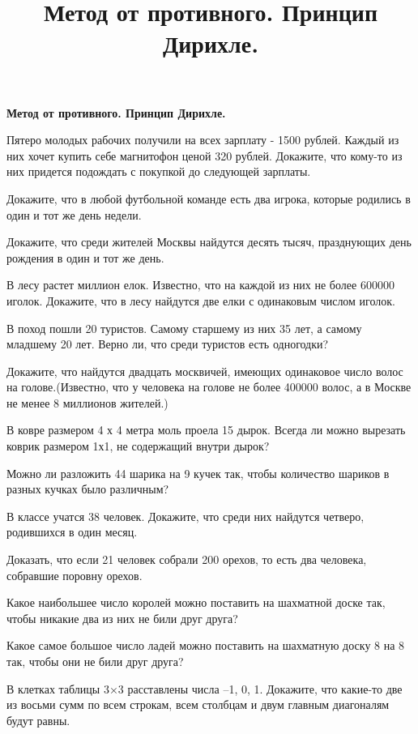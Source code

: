 \centerline{\bf \Huge Метод от противного. Принцип Дирихле.}
\title{Метод от противного. Принцип Дирихле.}

Пятеро молодых рабочих получили на всех зарплату - 1500 рублей. Каждый из них хочет купить себе магнитофон ценой 320 рублей. Докажите, что кому-то из них придется подождать с покупкой до следующей зарплаты.

Докажите, что в любой футбольной команде есть два игрока, которые родились в один и тот же день недели.

 Докажите, что среди жителей Москвы найдутся десять тысяч, празднующих день рождения в один и тот же день.

 В лесу растет миллион елок. Известно, что на каждой из них не более 600000 иголок. Докажите, что в лесу найдутся две елки с одинаковым числом иголок.

 В поход пошли 20 туристов. Самому старшему из них 35 лет, а самому младшему 20 лет. Верно ли, что среди туристов есть одногодки?

 Докажите, что найдутся двадцать москвичей, имеющих одинаковое число волос на голове.(Известно, что у человека на голове не более 400000 волос, а в Москве не менее 8 миллионов жителей.)

 В ковре размером 4 х 4 метра моль проела 15 дырок. Всегда ли можно вырезать коврик размером 1х1, не содержащий внутри дырок?

 Можно ли разложить 44 шарика на 9 кучек так, чтобы количество шариков в разных кучках было различным?

 В классе учатся 38 человек. Докажите, что среди них найдутся четверо, родившихся в один месяц.

 Доказать, что если 21 человек собрали 200 орехов, то есть два человека, собравшие поровну орехов.

 Какое наибольшее число королей можно поставить на шахматной доске так, чтобы никакие два из них не били друг друга?

 Какое самое большое число ладей можно поставить на шахматную доску 8 на 8 так, чтобы они не били друг друга?

 В клетках таблицы 3×3 расставлены числа –1, 0, 1.
Докажите, что какие-то две из восьми сумм по всем строкам, всем столбцам и двум главным диагоналям будут равны.